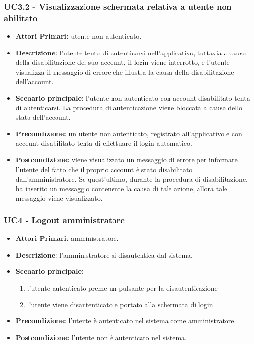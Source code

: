 \subsubsection{ UC3.2 - Visualizzazione schermata relativa a utente non abilitato}
\begin{itemize}
           	\item\textbf{Attori Primari:} utente non autenticato.
           	\item\textbf{Descrizione:} l'utente tenta di autenticarsi nell'applicativo, tuttavia a causa della disabilitazione del suo account, il login viene interrotto, e
           	l'utente visualizza il messaggio di errore che illustra la causa della disabilitazione dell'account.
           	\item\textbf{Scenario principale:} l’utente non autenticato con account disabilitato tenta di autenticarsi. 
           	La procedura di autenticazione viene bloccata a causa dello stato dell'account.
           	\item\textbf{Precondizione:} un utente non autenticato, registrato all'applicativo e con account disabilitato tenta di effettuare il login automatico. 
           	\item\textbf{Postcondizione:} viene visualizzato un messaggio di errore per informare l'utente del fatto che il 
           	proprio account è stato disabilitato dall'amministratore. Se quest'ultimo, durante la procedura di disabilitazione, ha inserito un messaggio contenente la causa di tale azione, allora tale messaggio viene visualizzato.
\end{itemize}


\subsubsection{ UC4 - Logout amministratore}
\begin{itemize}
	\item\textbf{Attori Primari:} 
	amministratore.
	\item\textbf{Descrizione:} 
	l'amministratore si disautentica dal sistema.
	\item\textbf{Scenario principale:} 
	\begin{enumerate}
		\item l'utente autenticato preme un pulsante per la disautenticazione
		\item l'utente viene disautenticato e portato alla schermata di login
	\end{enumerate}
	\item\textbf{Precondizione:} 
	l'utente è autenticato nel sistema come amministratore.
	\item\textbf{Postcondizione:}
	l'utente non è autenticato nel sistema.
\end{itemize}

